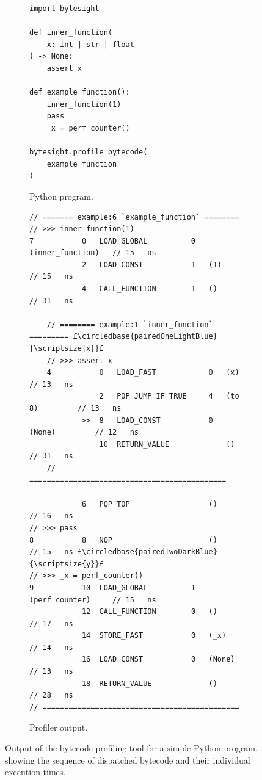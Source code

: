 \begin{figure}[H]
    \centering
    \begin{subfigure}[b]{0.275\textwidth}
       \centering
        \begin{verbatim}
import bytesight

def inner_function(
    x: int | str | float
) -> None:
    assert x

def example_function():
    inner_function(1)
    pass
    _x = perf_counter()

bytesight.profile_bytecode(
    example_function
)
        \end{verbatim}
        \footnotesize\vspace{6em}
        \caption{Python program.}
        \label{listing:profiler-example-python}
    \end{subfigure}
    \hfill
    \begin{subfigure}[b]{0.695\textwidth}
        \centering
        \begin{verbatim}
// ======= example:6 `example_function` ========
// >>> inner_function(1)
7           0   LOAD_GLOBAL          0   (inner_function)   // 15   ns
            2   LOAD_CONST           1   (1)                // 15   ns
            4   CALL_FUNCTION        1   ()                 // 31   ns

    // ======== example:1 `inner_function` ========= £\circledbase{pairedOneLightBlue}{\scriptsize{x}}£
    // >>> assert x
    4           0   LOAD_FAST            0   (x)            // 13   ns
                2   POP_JUMP_IF_TRUE     4   (to 8)         // 13   ns
            >>  8   LOAD_CONST           0   (None)         // 12   ns
                10  RETURN_VALUE             ()             // 31   ns
    // =============================================

            6   POP_TOP                  ()                 // 16   ns
// >>> pass
8           8   NOP                      ()                 // 15   ns £\circledbase{pairedTwoDarkBlue}{\scriptsize{y}}£
// >>> _x = perf_counter()
9           10  LOAD_GLOBAL          1   (perf_counter)     // 15   ns
            12  CALL_FUNCTION        0   ()                 // 17   ns
            14  STORE_FAST           0   (_x)               // 14   ns
            16  LOAD_CONST           0   (None)             // 13   ns
            18  RETURN_VALUE             ()                 // 28   ns
// =============================================
        \end{verbatim}
        \caption{Profiler output.}
        \label{listing:profiler-example-bytecode}
    \end{subfigure}
    \vspace{1em}
    \captionsetup{name=Listing}
    \caption{Output of the bytecode profiling tool for a simple Python program, showing the sequence of dispatched bytecode and their individual execution times.}
    \label{listing:profiler-example}
\end{figure}


